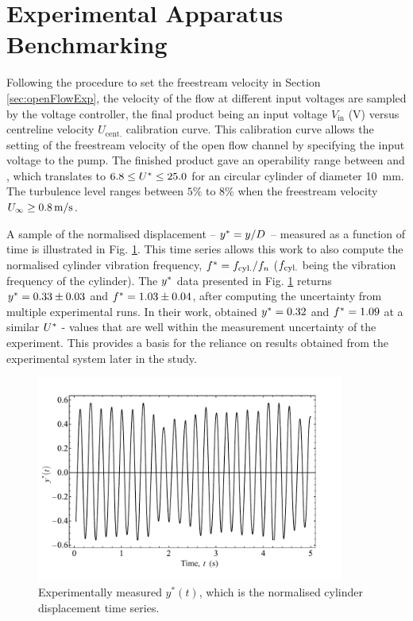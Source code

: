 \documentclass[oneside]{utmthesis}
\begin{document}
\section{Experimental Apparatus Benchmarking} \label{sec:appBenchmark}

 Following the procedure to set the freestream velocity in Section \ref{sec:openFlowExp}, the velocity of the flow at different input voltages are sampled by the voltage controller, the final product being an input voltage $V_{\text{in}}$ (V) versus centreline velocity $U_{\text{cent.}}$ calibration curve. This calibration curve allows the setting of the freestream velocity of the open flow channel by specifying the input voltage to the pump. The finished product gave an operability range between \uth{} and \uel{}, which translates to $6.8 \leq U^{*} \leq 25.0$ for an circular cylinder of diameter \SI{10}{\milli\metre}. The turbulence level ranges between $5\%$ to $8\%$ when the freestream velocity $U_{\infty} \geq \uei$.

 A sample of the normalised displacement -- $y^{*} = y/D$ -- measured as a function of time is illustrated in Fig. \ref{fig:sampTimeHist}. This time series allows this work to also compute the normalised cylinder vibration frequency, $f^{*} = f_{\text{cyl.}}/f_{n}$ ($f_{\text{cyl.}}$ being the vibration frequency of the cylinder). The $y^{*}$ data presented in Fig. \ref{fig:sampTimeHist} returns $y^{*} = 0.33 \pm 0.03$ and $f^{*} = 1.03 \pm 0.04$, after computing the uncertainty from multiple experimental runs. In their work, \citet{Koide2013} obtained $y^{*} = 0.32$ and $f^{*} = 1.09$ at a similar $U^{*}$ - values that are well within the measurement uncertainty of the experiment. This provides a basis for the reliance on results obtained from the experimental system later in the study.

\begin{figure}[!h]
  \centering
  \includegraphics[width=0.9\textwidth]{figs/figure5}
  \caption{Experimentally measured $y^{*}(t)$, which is the normalised cylinder displacement time series.}
  \label{fig:sampTimeHist}
\end{figure}
\end{document}
